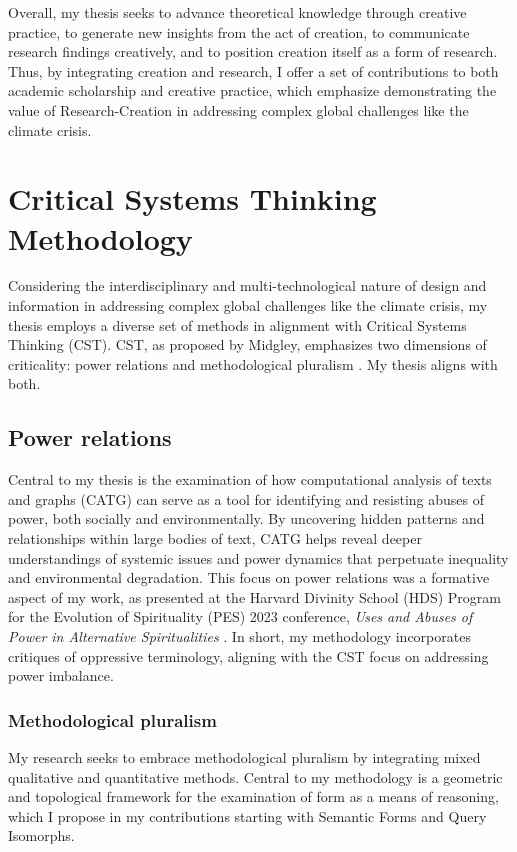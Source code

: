 Overall, my thesis seeks to advance theoretical knowledge through creative practice, to generate new insights from the act of creation, to communicate research findings creatively, and to position creation itself as a form of research. Thus, by integrating creation and research, I offer a set of contributions to both academic scholarship and creative practice, which emphasize demonstrating the value of Research-Creation in addressing complex global challenges like the climate crisis.
\noindent{}



\section{Critical Systems Thinking Methodology}
Considering the interdisciplinary and multi-technological nature of design and information in addressing complex global challenges like the climate crisis, my thesis employs a diverse set of methods in alignment with Critical Systems Thinking (CST). CST, as proposed by Midgley, emphasizes two dimensions of criticality: power relations and methodological pluralism \citep[p. 143]{sevaldson_designing_2022}. My thesis aligns with both. 

\subsection{Power relations}
Central to my thesis is the examination of how computational analysis of texts and graphs (CATG) can serve as a tool for identifying and resisting abuses of power, both socially and environmentally. By uncovering hidden patterns and relationships within large bodies of text, CATG helps reveal deeper understandings of systemic issues and power dynamics that perpetuate inequality and environmental degradation. This focus on power relations was a formative aspect of my work, as presented at the Harvard Divinity School (HDS) Program for the Evolution of Spirituality (PES) 2023 conference, \textit{Uses and Abuses of Power in Alternative Spiritualities} \citep{1496651,castano-suarez_biopower_2024,1496711,castano-suarez_song_2023-1}. In short, my methodology incorporates critiques of oppressive terminology, aligning with the CST focus on addressing power imbalance.  

\subsubsection{Methodological pluralism}
My research seeks to embrace methodological pluralism by integrating mixed qualitative and quantitative methods. Central to my methodology is a geometric and topological framework for the examination of form as a means of reasoning, which I propose in my contributions starting with Semantic Forms and Query Isomorphs.
\noindent{} 

